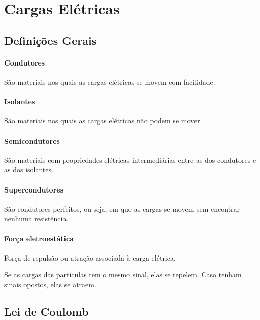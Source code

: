 \section{Cargas Elétricas}\label{cargas-eluxe9tricas}

\subsection{Definições Gerais}\label{definiuxe7uxf5es-gerais}

\paragraph{Condutores}\label{condutores}

São materiais nos quais as cargas elétricas se movem com facilidade.

\paragraph{Isolantes}\label{isolantes}

São materiais nos quais as cargas elétricas não podem se mover.

\paragraph{Semicondutores}\label{semicondutores}

São materiais com propriedades elétricas intermediárias entre as dos
condutores e as dos isolantes.

\paragraph{Supercondutores}\label{supercondutores}

São condutores perfeitos, ou seja, em que as cargas se movem sem
encontrar nenhuma resistência.

\paragraph{Força eletroestática}\label{foruxe7a-eletroestuxe1tica}

Força de repulsão ou atração associada à carga elétrica.

Se as cargas das partículas tem o mesmo sinal, elas se repelem. Caso
tenham sinais opostos, elas se atraem.

\subsection{Lei de Coulomb}\label{lei-de-coulomb}

